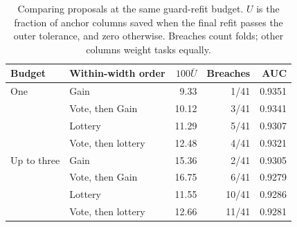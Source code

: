 \begin{table}[tb]
\centering
\caption{Comparing proposals at the same guard-refit budget. $U$ is the fraction of anchor columns saved when the final refit passes the outer tolerance, and zero otherwise. Breaches count folds; other columns weight tasks equally.}
\label{tab:operating-guards}
\small\setlength{\tabcolsep}{3pt}
\begin{tabular}{@{}llrrr@{}}
\toprule
Budget & Within-width order & $100\bar U$ & Breaches & AUC \\
\midrule
One & Gain & 9.33 & 1/41 & 0.9351 \\
 & Vote, then Gain & 10.12 & 3/41 & 0.9341 \\
 & Lottery & 11.29 & 5/41 & 0.9307 \\
 & Vote, then lottery & 12.48 & 4/41 & 0.9321 \\
\midrule
Up to three & Gain & 15.36 & 2/41 & 0.9305 \\
 & Vote, then Gain & 16.75 & 6/41 & 0.9279 \\
 & Lottery & 11.55 & 10/41 & 0.9286 \\
 & Vote, then lottery & 12.66 & 11/41 & 0.9281 \\
\bottomrule
\end{tabular}
\end{table}
